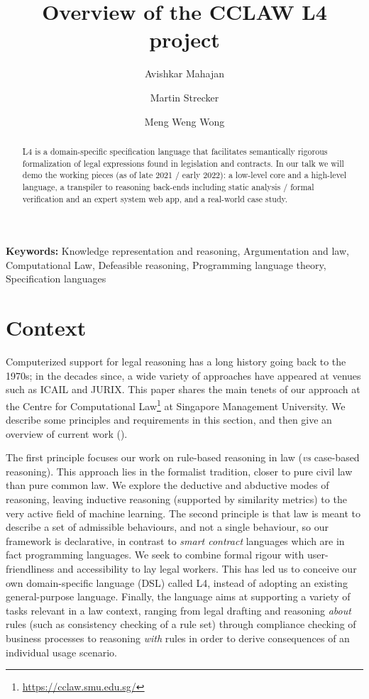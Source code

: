 \documentclass[10pt,a4paper]{article}
\begin{document}
\title{Overview of the CCLAW L4 project}
\author{Avishkar Mahajan} 
\author{Martin Strecker} 
\author{Meng Weng Wong}

\date{}
\maketitle

\begin{abstract}
\noindent L4 is a domain-specific specification language that facilitates semantically rigorous formalization of legal expressions found in legislation and contracts. In our talk we will demo the working pieces (as of late 2021 / early 2022): a low-level core and a high-level language, a transpiler to reasoning back-ends including static analysis / formal verification and an expert system web app, and a real-world case study.
\end{abstract}

\textbf{Keywords:} 
  Knowledge representation and reasoning,
  Argumentation and law,
  Computational Law,
  Defeasible reasoning,
  Programming language theory,
  Specification languages



\section{Context}\label{sec:context}

Computerized support for legal reasoning has a long history going back to the
1970s; in the decades since, a wide variety of approaches have appeared at venues such as ICAIL and JURIX.
This paper shares the main tenets of our approach at the Centre
for Computational Law\footnote{\url{https://cclaw.smu.edu.sg/}} at Singapore
Management University. We describe some principles and requirements in
this section, and then give an overview of current work
().

The first principle focuses our work on rule-based reasoning in law (\emph{vs} case-based reasoning). This approach lies in the formalist tradition, closer to pure civil law than pure common law. We explore the deductive and abductive modes of reasoning, leaving inductive reasoning (supported by similarity metrics) to the very active field of machine learning.
The second principle is that law is meant to
describe a set of admissible behaviours, and not a single behaviour, so our
framework is declarative, in contrast to
\emph{smart contract} languages which are in fact programming
languages. We seek to combine formal rigour with
user-friendliness and accessibility to lay legal workers. This has led us to conceive our own domain-specific language
(DSL) called L4, instead of adopting an existing general-purpose
language.
Finally, the language aims at supporting a variety of tasks relevant
in a law context, ranging from legal drafting and reasoning \emph{about} rules
(such as consistency checking of a rule set) through compliance checking of
business processes to reasoning \emph{with} rules in order to derive
consequences of an individual usage scenario.
\end{document}
